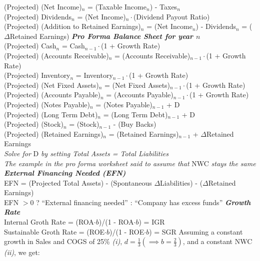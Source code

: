 \documentclass{letter}
\newcommand{\textib}[1]{\textit{\textbf{{#1}}}}
\begin{document}
(Projected) (Net Income)$_n$ = (Taxable Income$_n$) - Taxes$_n$ \\
(Projected) Dividends$_n$ = (Net Income)$_n \cdot$(Dividend Payout Ratio) \\
(Projected) (Addition to Retained Earnings)$_n$ = (Net Income$_n$) - Dividends$_n$ = ($\Delta$Retained Earnings)
\newline
\textib{Pro Forma Balance Sheet for year $n$} \\
(Projected) Cash$_n$ = Cash$_{n - 1} \cdot$(1 + Growth Rate) \\
(Projected) (Accounts Receivable)$_n$ = (Accounts Receivable)$_{n - 1} \cdot$(1 + Growth Rate) \\
(Projected) Inventory$_n$ = Inventory$_{n - 1} \cdot$(1 + Growth Rate) \\
(Projected) (Net Fixed Assets)$_n$ = (Net Fixed Assets)$_{n - 1} \cdot$(1 + Growth Rate) \\
(Projected) (Accounts Payable)$_n$ = (Accounts Payable)$_{n - 1} \cdot$(1 + Growth Rate) \\
(Projected) (Notes Payable)$_n$ = (Notes Payable)$_{n - 1}$ + D \\
(Projected) (Long Term Debt)$_n$ = (Long Term Debt)$_{n - 1}$ + D \\
(Projected) (Stock)$_n$ = (Stock)$_{n - 1}$ - (Buy Backs) \\
(Projected) (Retained Earnings)$_n$ = (Retained Earnings)$_{n - 1}$ + $\Delta$Retained Earnings \\
\textit{Solve for} D \textit{by setting Total Assets = Total Liabilities} \\
\textit{The example in the pro forma worksheet said to assume that} NWC \textit{stays the same}
\newline
\textib{External Financing Needed (EFN)} \\
EFN = (Projected Total Assets) - (Spontaneous $\Delta$Liabilities) - ($\Delta$Retained Earnings) \\
EFN $> 0$ ? ``External financing needed'' : ``Company has excess funds''
\newline
\textib{Growth Rate} \\
Internal Groth Rate = (ROA$\cdot b$)/(1 - ROA$\cdot b$) = IGR \\
Sustainable Groth Rate = (ROE$\cdot b$)/(1 - ROE$\cdot b$) = SGR
\newline
Assuming a constant growth in Sales and COGS of 25\% \textit{(i)}, 
$d = \frac{1}{3} (\implies b = \frac{2}{3})$, 
and a constant NWC \textit{(ii)}, we get:
\newline
\end{document}
